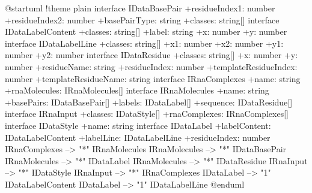 @startuml
!theme plain
interface IDataBasePair {
    +residueIndex1: number
    +residueIndex2: number
    +basePairType: string
    +classes: string[]
}
interface IDataLabelContent {
    +classes: string[]
    +label: string
    +x: number
    +y: number
}
interface IDataLabelLine {
    +classes: string[]
    +x1: number
    +x2: number
    +y1: number
    +y2: number
}
interface IDataResidue {
    +classes: string[]
    +x: number
    +y: number
    +residueName: string
    +residueIndex: number
    +templateResidueIndex: number
    +templateResidueName: string
}
interface IRnaComplexes {
    +name: string
    +rnaMolecules: IRnaMolecules[]
}
interface IRnaMolecules {
    +name: string
    +basePairs: IDataBasePair[]
    +labels: IDataLabel[]
    +sequence: IDataResidue[]
}
interface IRnaInput {
    +classes: IDataStyle[]
    +rnaComplexes: IRnaComplexes[]
}
interface IDataStyle {
    +name: string
}
interface IDataLabel {
    +labelContent: IDataLabelContent
    +labelLine: IDataLabelLine
    +residueIndex: number
}
IRnaComplexes --> "*" IRnaMolecules
IRnaMolecules --> "*" IDataBasePair
IRnaMolecules --> "*" IDataLabel
IRnaMolecules --> "*" IDataResidue
IRnaInput --> "*" IDataStyle
IRnaInput --> "*" IRnaComplexes
IDataLabel --> "1" IDataLabelContent
IDataLabel --> "1" IDataLabelLine
@enduml
